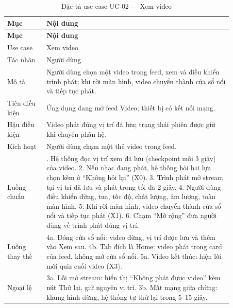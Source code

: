 \begingroup\small\renewcommand{\arraystretch}{1.15}\setlength{\tabcolsep}{3pt}
\begin{longtable}{>{\RaggedRight\arraybackslash}p{0.16\linewidth}>{\RaggedRight\arraybackslash}p{0.76\linewidth}}
\caption{Đặc tả use case UC-02 --- Xem video}
\label{tab:spec-uc-02}\\
\toprule
\textbf{Mục} & \textbf{Nội dung} \\
\midrule
\endfirsthead
\toprule
\textbf{Mục} & \textbf{Nội dung} \\
\midrule
\endhead
\bottomrule
\endfoot
Use case & Xem video \\
Tác nhân & Người dùng \\
Mô tả & Người dùng chọn một video trong feed, xem và điều khiển trình phát; khi rời màn hình, video chuyển thành cửa sổ nổi và tiếp tục phát. \\
Tiên điều kiện & Ứng dụng đang mở feed Video; thiết bị có kết nối mạng. \\
Hậu điều kiện & Video phát đúng vị trí đã lưu; trạng thái phiên được giữ khi chuyển phân hệ. \\
Kích hoạt & Người dùng chạm một thẻ video trong feed. \\
Luồng chuẩn & 1. Hệ thống đọc vị trí xem đã lưu (checkpoint mỗi 3 giây) của video. 2. Nếu nhạc đang phát, hệ thống hỏi hai lựa chọn kèm ô “Không hỏi lại” (X0). 3. Trình phát mở stream tại vị trí đã lưu và phát trong tối đa 2 giây. 4. Người dùng điều khiển dừng, tua, tốc độ, chất lượng, âm lượng, toàn màn hình. 5. Khi rời màn hình, video chuyển thành cửa sổ nổi và tiếp tục phát (X1). 6. Chạm “Mở rộng” đưa người dùng về trình phát đúng vị trí. \\
Luồng thay thế & 4a. Đóng cửa sổ nổi: video dừng, vị trí được lưu và thêm vào Xem sau. 4b. Tab đích là Home: video phát trong card của feed, không mở cửa sổ nổi. 5a. Video kết thúc: hiện lời mời quiz cuối video (X3). \\
Ngoại lệ & 3a. Lỗi mở stream: hiển thị “Không phát được video” kèm nút Thử lại, giữ nguyên vị trí. 3b. Mất mạng giữa chừng: khung hình dừng, hệ thống tự thử lại trong 5--15 giây. \\
\end{longtable}
\endgroup

